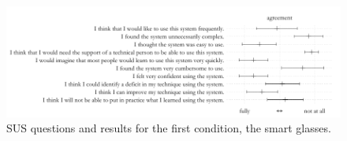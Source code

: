 \begin{figure}[h]
    \centering
    \includegraphics[width=\textwidth]{figures/plots/sus-glasses.pdf}
    \caption{SUS questions and results for the first condition, the smart glasses.}
    \label{fig:sus-glasses}
\end{figure}
